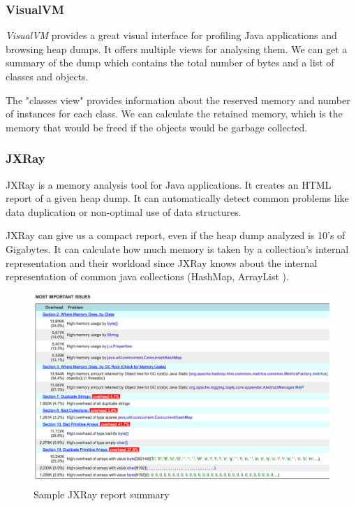 \subsubsection{VisualVM}
\textit{VisualVM} provides a great visual interface for profiling Java applications and browsing heap dumps. It offers multiple views for analysing them. We can get a summary of the dump which contains the total number of bytes and a list of classes and objects.

The "classes view" provides information about the reserved memory and number of instances for each class. We can calculate the retained memory, which is the memory that would be freed if the objects would be garbage collected.

\subsubsection{JXRay}
JXRay \cite{jxray} is a memory analysis tool for Java applications. It creates an HTML report of a given heap dump. It can automatically detect common problems like data duplication or non-optimal use of data structures. 

JXRay can give us a compact report, even if the heap dump analyzed is 10's of Gigabytes. It can calculate how much memory is taken by a collection's internal representation and their workload since JXRay knows about the internal representation of common java collections (HashMap, ArrayList \etc).

\begin{figure}[H]
	\includegraphics[width=150mm, keepaspectratio]{figures/jxray_sample.png}
	\centering
	\caption{Sample JXRay report summary}
\end{figure}

